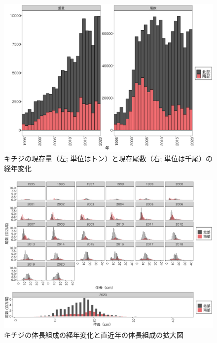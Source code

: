 \documentclass[11pt]{article} %
\begin{document}
\begin{linenumbers}
\begin{figure}[h]
  \centering
  \includegraphics[width = 14cm]{キチジtrend.png}
  \caption{キチジの現存量（左; 単位はトン）と現存尾数（右; 単位は千尾）の経年変化}
\end{figure}

\begin{figure}[h]
  \centering
  \includegraphics[width = 14cm]{キチジlength.png}
  \caption{キチジの体長組成の経年変化と直近年の体長組成の拡大図}
\end{figure}


\end{linenumbers}
\end{document}
